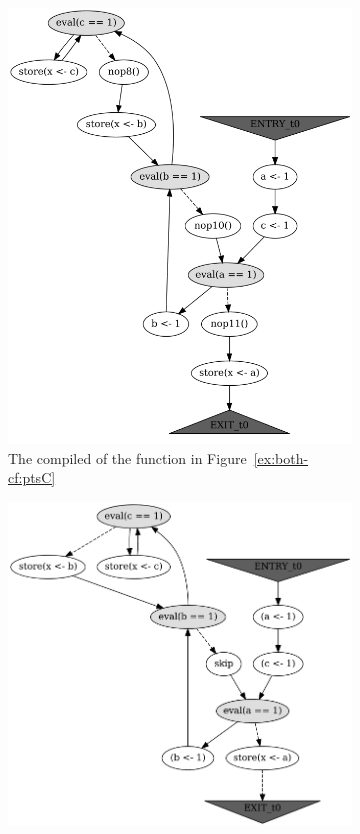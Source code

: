 \begin{figure}[!h]
%
\begin{subfigure}[b]{.49\textwidth}\centering
  \includegraphics[width=\textwidth,keepaspectratio]{img/my/graphs/unrolling-comparison/PorthosC/t0.png}
  \caption{The compiled \xgraph{} of the function in Figure~\ref{ex:both-cf:ptsC}}
  \label{ex:both-cf:graph:ptsC}
\end{subfigure}
%
\begin{subfigure}[b]{.49\textwidth}\centering	
  \includegraphics[width=\textwidth,keepaspectratio]{img/my/graphs/unrolling-comparison/Porthos/t0.png}

\end{subfigure}
\end{figure}
